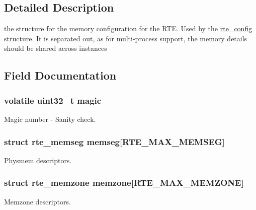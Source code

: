 \subsection{Detailed Description}
the structure for the memory configuration for the R\+T\+E. Used by the \hyperlink{structrte__config}{rte\+\_\+config} structure. It is separated out, as for multi-\/process support, the memory details should be shared across instances 

\subsection{Field Documentation}
\hypertarget{structrte__mem__config_a199149e6c37b30c03fa42cf555ce8265}{}
\subsubsection[{magic}]{\setlength{\rightskip}{0pt plus 5cm}volatile uint32\+\_\+t magic}\label{structrte__mem__config_a199149e6c37b30c03fa42cf555ce8265}
Magic number -\/ Sanity check. \hypertarget{structrte__mem__config_a37677c0bd56a3232877182f1a1b64a37}{}
\subsubsection[{memseg}]{\setlength{\rightskip}{0pt plus 5cm}struct {\bf rte\+\_\+memseg} memseg\mbox{[}R\+T\+E\+\_\+\+M\+A\+X\+\_\+\+M\+E\+M\+S\+E\+G\mbox{]}}\label{structrte__mem__config_a37677c0bd56a3232877182f1a1b64a37}
Physmem descriptors. \hypertarget{structrte__mem__config_abec5328c0274d906b74bb04c5143021d}{}
\subsubsection[{memzone}]{\setlength{\rightskip}{0pt plus 5cm}struct {\bf rte\+\_\+memzone} memzone\mbox{[}R\+T\+E\+\_\+\+M\+A\+X\+\_\+\+M\+E\+M\+Z\+O\+N\+E\mbox{]}}\label{structrte__mem__config_abec5328c0274d906b74bb04c5143021d}
Memzone descriptors. \hypertarget{structrte__mem__config_a678943999c92d21217de78b08a6e9932}{}
